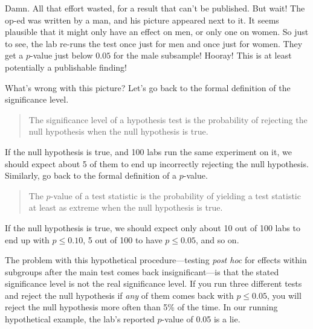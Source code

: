 \documentclass[12pt,oneside,openany]{book}
\begin{document}
Damn. All that effort wasted, for a result that can't be published. But
wait! The op-ed was written by a man, and his picture appeared next to
it. It seems plausible that it might only have an effect on men, or only
one on women. So just to see, the lab re-runs the test once just for men
and once just for women. They get a \(p\)-value just below \(0.05\) for
the male subsample! Hooray! This is at least potentially a publishable
finding!

What's wrong with this picture? Let's go back to the formal definition
of the significance level.

\begin{quote}
The significance level of a hypothesis test is the probability of
rejecting the null hypothesis when the null hypothesis is true.
\end{quote}

If the null hypothesis is true, and 100 labs run the same experiment on
it, we should expect about 5 of them to end up incorrectly rejecting the
null hypothesis. Similarly, go back to the formal definition of a
\(p\)-value.

\begin{quote}
The \(p\)-value of a test statistic is the probability of yielding a
test statistic at least as extreme when the null hypothesis is true.
\end{quote}

If the null hypothesis is true, we should expect only about 10 out of
100 labs to end up with \(p \leq 0.10\), 5 out of 100 to have
\(p \leq 0.05\), and so on.

The problem with this hypothetical procedure---testing \emph{post hoc}
for effects within subgroups after the main test comes back
insignificant---is that the stated significance level is not the real
significance level. If you run three different tests and reject the null
hypothesis if \emph{any} of them comes back with \(p \leq 0.05\), you
will reject the null hypothesis more often than 5\% of the time. In our
running hypothetical example, the lab's reported \(p\)-value of 0.05 is
a lie.
\end{document}
